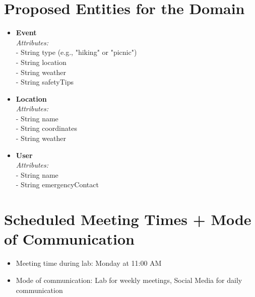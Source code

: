 \documentclass{article}
\begin{document}
\section*{Proposed Entities for the Domain}
\begin{itemize}
    \item \textbf{Event} \\
    \textit{Attributes:} \\
    - String type (e.g., "hiking" or "picnic") \\
    - String location \\
    - String weather \\
    - String safetyTips
    \item \textbf{Location} \\
    \textit{Attributes:} \\
    - String name \\
    - String coordinates \\
    - String weather
    \item \textbf{User} \\
    \textit{Attributes:} \\
    - String name \\
    - String emergencyContact
\end{itemize}

\section*{Scheduled Meeting Times + Mode of Communication}
\begin{itemize}
    \item Meeting time during lab: Monday at 11:00 AM
    \item Mode of communication: Lab for weekly meetings, Social Media for daily communication
\end{itemize}
\end{document}
